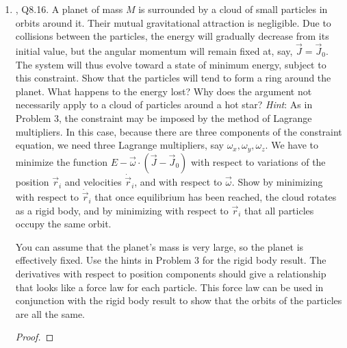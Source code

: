 \documentclass[../psets.tex]{subfiles}
\begin{document}
\begin{enumerate}
    \item \textcite{bib:KibbleBerkshire}, Q8.16. A planet of mass $M$ is surrounded by a cloud of small particles in orbits around it. Their mutual gravitational attraction is negligible. Due to collisions between the particles, the energy will gradually decrease from its initial value, but the angular momentum will remain fixed at, say, $\vec{J}=\vec{J}_0$. The system will thus evolve toward a state of minimum energy, subject to this constraint. Show that the particles will tend to form a ring around the planet. What happens to the energy lost? Why does the argument not necessarily apply to a cloud of particles around a hot star? \emph{Hint}: As in Problem 3, the constraint may be imposed by the method of Lagrange multipliers. In this case, because there are three components of the constraint equation, we need three Lagrange multipliers, say $\omega_x,\omega_y,\omega_z$. We have to minimize the function $E-\vec{\omega}\cdot(\vec{J}-\vec{J}_0)$ with respect to variations of the position $\vec{r}_i$ and velocities $\dot{\vec{r}}_i$, and with respect to $\vec{\omega}$. Show by minimizing with respect to $\dot{\vec{r}}_i$ that once equilibrium has been reached, the cloud rotates as a rigid body, and by minimizing with respect to $\vec{r}_i$ that all particles occupy the same orbit.\par
    You can assume that the planet's mass is very large, so the planet is effectively fixed. Use the hints in Problem 3 for the rigid body result. The derivatives with respect to position components should give a relationship that looks like a force law for each particle. This force law can be used in conjunction with the rigid body result to show that the orbits of the particles are all the same.
    \begin{proof}
        
        

\end{proof}
\end{enumerate}
\end{document}
